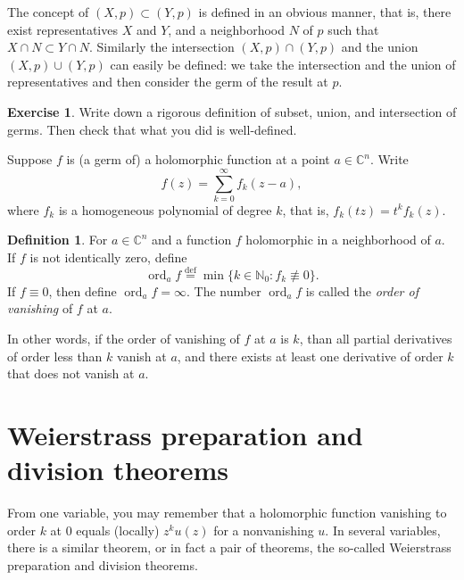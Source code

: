 \documentclass[12pt,openany]{book}
\newcommand{\ord}{\operatorname{ord}}
\newcommand{\C}{{\mathbb{C}}}
\newcommand{\N}{{\mathbb{N}}}
\newcommand{\myindex}[1]{#1\index{#1}}
\newcommand{\sectionnewpage}{}
\theoremstyle{plain}
\theoremstyle{remark}
\theoremstyle{definition}
\newtheorem{defn}[thm]{Definition}
\newenvironment{exbox}{%
    \def\FrameCommand{\vrule width 1pt \relax\hspace {10pt}}%
    \MakeFramed {\advance \hsize -\width \FrameRestore }%
}{%
    \endMakeFramed
}
\theoremstyle{exercise}
\newtheorem{exercise}{Exercise}[section]
\theoremstyle{example}
\begin{document}
The concept of $(X,p) \subset (Y,p)$ is defined in an obvious manner,
that is, there exist representatives $X$ and $Y$, and a neighborhood $N$
of $p$ such that $X \cap N \subset Y \cap N$.
Similarly the intersection $(X,p) \cap (Y,p)$ and
the union $(X,p) \cup (Y,p)$ can easily be defined: we take the intersection
and the union of representatives and then consider the germ of the result at $p$.

\begin{exbox}
\begin{exercise}
Write down a rigorous definition of subset, union, and intersection of germs.
Then check that what you did is well-defined.
\end{exercise}
\end{exbox}

Suppose
$f$ is (a germ of) a holomorphic function at a point $a \in \C^n$.
Write
\begin{equation*}
f(z) = \sum_{k=0}^\infty f_k(z-a),
\end{equation*}
where $f_k$ is a homogeneous polynomial of degree $k$,
that is, $f_k(tz) = t^k f_k(z)$.

\begin{defn}
For $a \in \C^n$ and a function $f$ holomorphic in a neighborhood of $a$.
If $f$ is not identically zero,
define
%
\begin{equation*}
\ord_a f \overset{\text{def}}{=} \min \{ k \in \N_0 : f_k \not\equiv 0 \} .
\end{equation*}
If $f \equiv 0$, then define $\ord_a f = \infty$.
The number $\ord_a f$ is called the \emph{\myindex{order of vanishing}} of $f$ at $a$.
\end{defn}

In other words, if the order of vanishing of $f$ at $a$ is $k$, than all
partial derivatives of order less than $k$ vanish at $a$, and there exists
at least one derivative of order $k$ that does not vanish at $a$.


\sectionnewpage
\section{Weierstrass preparation and division theorems} \label{sec:wpt}

From one variable, you may remember that a holomorphic function 
vanishing to order $k$ at 0 equals (locally) $z^k u(z)$ for a nonvanishing $u$.
In several variables, there is a similar theorem, or in fact a pair of theorems,
the so-called Weierstrass preparation and
division theorems.
\end{document}
